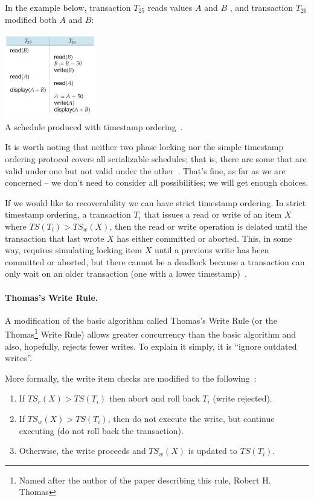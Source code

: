 In the example below, transaction $T_{25}$ reads values $A$ and $B$ , and transaction $T_{26}$ modified both $A$ and $B$:

\begin{center}
	\includegraphics[width=0.3\textwidth]{images/timestamp-schedule}\\
	A schedule produced with timestamp ordering~\cite{dsc}.
\end{center}

It is worth noting that neither two phase locking nor the simple timestamp ordering protocol covers all serializable schedules; that is, there are some that are valid under one but not valid under the other~\cite{fds}. That's fine, as far as we are concerned -- we don't need to consider all possibilities; we will get enough choices.

If we would like to recoverability we can have strict timestamp ordering. In strict timestamp ordering, a transaction $T_{i}$ that issues a read or write of an item $X$ where $T\!S(T_{i}) > T\!S_{w}(X)$, then the read or write operation is delated until the transaction that last wrote $X$ has either committed or aborted. This, in some way, requires simulating locking item $X$ until a previous write has been committed or aborted, but there cannot be a deadlock because a transaction can only wait on an older transaction (one with a  lower timestamp)~\cite{fds}.

\paragraph{Thomas's Write Rule.} A modification of the basic algorithm called Thomas's Write Rule (or the Thomas\footnote{Named after the author of the paper describing this rule, Robert H. Thomas} Write Rule) allows greater concurrency than the basic algorithm and also, hopefully, rejects fewer writes. To explain it simply, it is ``ignore outdated writes''.

More formally, the write item checks are modified to the following~\cite{fds}:
\begin{enumerate}
	\item If $T\!S_{r}(X) > T\!S(T_{i})$ then abort and roll back $T_{i}$ (write rejected).
	\item If $T\!S_{w}(X) > T\!S(T_{i})$, then do not execute the write, but continue executing (do not roll back the transaction).
	\item Otherwise, the write proceeds and $T\!S_{w}(X)$ is updated to $T\!S(T_{i})$. 
\end{enumerate}

